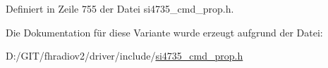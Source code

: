 Definiert in Zeile 755 der Datei si4735\+\_\+cmd\+\_\+prop.\+h.



Die Dokumentation für diese Variante wurde erzeugt aufgrund der Datei\+:\begin{DoxyCompactItemize}
\item 
D\+:/\+G\+I\+T/fhradiov2/driver/include/\hyperlink{si4735__cmd__prop_8h}{si4735\+\_\+cmd\+\_\+prop.\+h}\end{DoxyCompactItemize}
